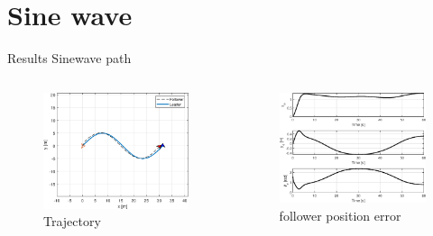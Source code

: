 \documentclass{beamer}
\begin{document}
\section{Sine wave}
\begin{frame}{Results} {Sinewave path}
\begin{columns}
\begin{column}{0.5\textwidth}
\begin{figure}
\includegraphics[scale=0.4]{figs/matlab/gradientDescent/sinewave/trajectorySinewave.eps}
\caption{Trajectory}
\end{figure}
\end{column}

\begin{column}{0.5\textwidth}
\begin{center}

\begin{figure}
\includegraphics[scale=0.4]{figs/matlab/gradientDescent/sinewave/stateErrorSinewave.eps}
\caption{follower position error}
\end{figure}
\end{center}

\end{column}

\end{columns}
\end{frame}
\end{document}
